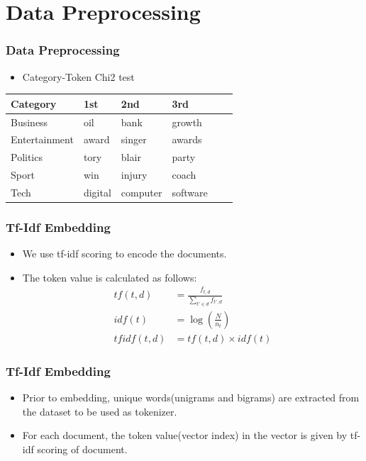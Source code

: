 \documentclass[
  10pt %
  16:9, %
]{beamer}
\begin{document}
\section{Data Preprocessing}
\frame
{
  \frametitle{Data Preprocessing}
  \begin{itemize}
  \item Category-Token Chi2 test
  \end{itemize}
  \begin{table}
  \centering
  \begin{tabular}{@{}llllll@{}}
    \toprule
    Category       & 1st       & 2nd      & 3rd      \\ \midrule
    Business       & oil       & bank     & growth   \\
    Entertainment  & award     & singer   & awards   \\
    Politics       & tory      & blair    & party    \\
    Sport          & win       & injury   & coach    \\
    Tech           & digital   & computer & software \\
    \bottomrule
  \end{tabular}
  \end{table}
}

\begin{frame}
  \frametitle{Tf-Idf Embedding}
  \begin{itemize}
  \item We use tf-idf scoring to encode the documents.
  \item The token value is calculated as follows:
  \begin{align}
    tf(t,d) &= \frac{f_{t,d}}{\sum_{t' \in d} f_{t',d}} \\
    idf(t) &= \log\left(\frac{N}{n_t}\right) \\
    tfidf(t,d) &= tf(t,d) \times idf(t)
  \end{align}
  \end{itemize}
\end{frame}

\begin{frame}
  \frametitle{Tf-Idf Embedding}
  \begin{itemize}
  \item Prior to embedding, unique words(unigrams and bigrams) are extracted from the dataset to be used as tokenizer.
    \item For each document, the token value(vector index) in the vector is given by tf-idf scoring of document.
  \end{itemize}
\end{frame}
\end{document}
